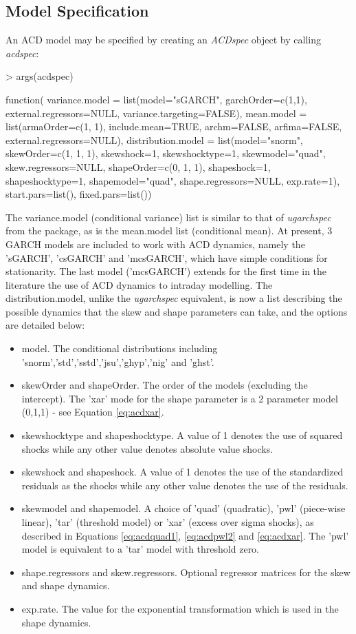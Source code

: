 \subsection{Model Specification}
An ACD model may be specified by creating an \emph{ACDspec} object by calling \emph{acdspec}:
\begin{Schunk}
\begin{Sinput}
> args(acdspec)
\end{Sinput}
\begin{Soutput}
function(
variance.model = list(model="sGARCH", garchOrder=c(1,1), external.regressors=NULL,
variance.targeting=FALSE),
mean.model = list(armaOrder=c(1, 1), include.mean=TRUE, archm=FALSE, arfima=FALSE,
external.regressors=NULL),
distribution.model = list(model="snorm", skewOrder=c(1, 1, 1), skewshock=1,
skewshocktype=1, skewmodel="quad", skew.regressors=NULL, shapeOrder=c(0, 1, 1),
shapeshock=1, shapeshocktype=1, shapemodel="quad", shape.regressors=NULL,
exp.rate=1), start.pars=list(), fixed.pars=list())
\end{Soutput}
\end{Schunk}
The variance.model (conditional variance) list is similar to that of \emph{ugarchspec} from the \verb@rugarch@ package, as is
the mean.model list (conditional mean). At present, 3 GARCH models are included to work with ACD dynamics, namely the 'sGARCH',
'csGARCH' and 'mcsGARCH', which have simple conditions for stationarity. The last model ('mcsGARCH') extends for the first time
in the literature the use of ACD dynamics to intraday modelling.
The distribution.model, unlike the \emph{ugarchspec} equivalent, is now a list describing the possible dynamics that the skew
and shape parameters can take, and the options are detailed below:
\begin{itemize}
\item model. The conditional distributions including 'snorm','std','sstd','jsu','ghyp','nig' and 'ghst'.
\item skewOrder and shapeOrder. The order of the models (excluding the intercept). The 'xar' mode for the shape parameter is a 2 parameter model (0,1,1) - see Equation \ref{eq:acdxar}.
\item skewshocktype and shapeshocktype. A value of 1 denotes the use of squared shocks while any other value denotes absolute value shocks.
\item skewshock and shapeshock. A value of 1 denotes the use of the standardized residuals as the shocks while any other value denotes the use
of the residuals.
\item skewmodel and shapemodel. A choice of 'quad' (quadratic), 'pwl' (piece-wise linear), 'tar' (threshold model) or 'xar' (excess over sigma shocks),
as described in Equations \ref{eq:acdquad1}, \ref{eq:acdpwl2} and \ref{eq:acdxar}. The 'pwl' model is equivalent to a 'tar' model with threshold zero.
\item shape.regressors and skew.regressors. Optional regressor matrices for the skew and shape dynamics.
\item exp.rate. The value for the exponential transformation which is used in the shape dynamics.
\end{itemize}
